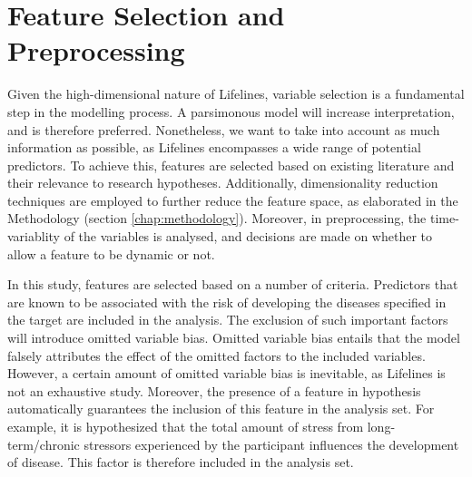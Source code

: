 \section{Feature Selection and Preprocessing}
\label
{section:data:feature_selection_and_preprocessing}
Given the high-dimensional nature of Lifelines, variable selection is a fundamental step in the modelling process. A parsimonous model will increase interpretation, and is therefore preferred. Nonetheless, we want to take into account as much information as possible, as Lifelines encompasses a wide range of potential predictors. To achieve this, features are selected based on existing literature and their relevance to research hypotheses. Additionally, dimensionality reduction techniques are employed to further reduce the feature space, as elaborated in the Methodology (section \ref{chap:methodology}). Moreover, in preprocessing, the time-variablity of the variables is analysed, and decisions are made on whether to allow a feature to be dynamic or not. 

In this study, features are selected based on a number of criteria. Predictors that are known to be associated with the risk of developing the diseases specified in the target are included in the analysis. The exclusion of such important factors will introduce omitted variable bias. Omitted variable bias entails that the model falsely attributes the effect of the omitted factors to the included variables. However, a certain amount of omitted variable bias is inevitable, as Lifelines is not an exhaustive study. Moreover, the presence of a feature in hypothesis automatically guarantees the inclusion of this feature in the analysis set. For example, it is hypothesized that the total amount of stress from long-term/chronic stressors experienced by the participant influences the development of disease. This factor is therefore included in the analysis set. 

